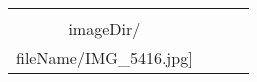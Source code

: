 \begin{table}
\begin{tabular}{cccc}
\texttt{[image: \\imageDir/\\fileName/IMG\_5416.jpg]} 
\end{tabular}
\end{table}
